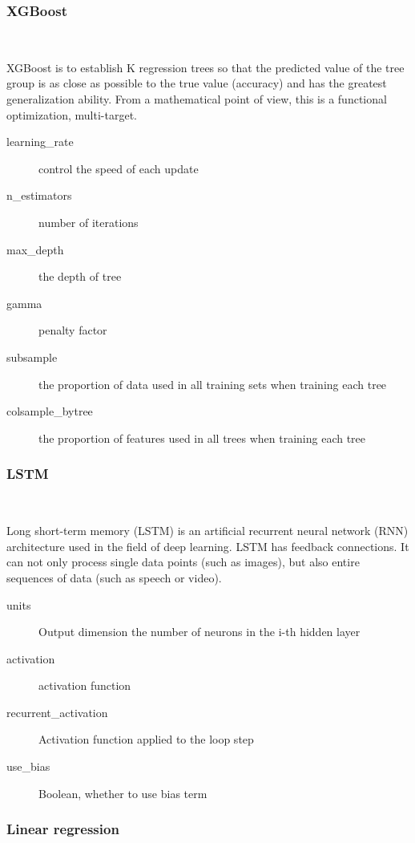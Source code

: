 	
\subsubsection{XGBoost}
\
 
XGBoost is to establish K regression trees 
so that the predicted value of 
the tree group is as close as possible to 
the true value (accuracy) and 
has the greatest generalization ability. 
From a mathematical point of view, 
this is a functional optimization, multi-target.

\begin{description}
	\item[learning_rate]  control the speed of each update
	\item[n_estimators] number of iterations
	\item[max_depth] the depth of tree
	\item[gamma] penalty factor%
	\item[subsample] the proportion of data used in 
		all training sets when training each tree
	\item[colsample_bytree] the proportion of features used 
		in all trees when training each tree
	\end{description}

\subsubsection{LSTM}
\

Long short-term memory (LSTM) is an artificial 
recurrent neural network (RNN) 
architecture used in the field of 
deep learning. LSTM has feedback connections. 
It can not only process single data 
points (such as images), but also entire 
sequences of data (such as speech or video). 
	
	
\begin{description}
	\item[units] Output dimension 
		the number of neurons in the i-th hidden layer
	\item[activation] activation function
	\item[recurrent_activation] Activation function applied to the loop step
	\item[use_bias] Boolean, whether to use bias term
\end{description}

\subsubsection{Linear regression}
\

